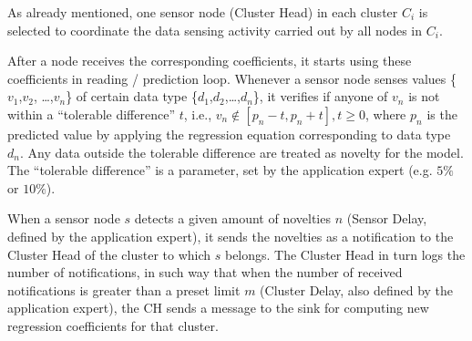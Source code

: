 \documentclass{acm_proc_article-sp}
\begin{document}

As already mentioned, one sensor node (Cluster Head) in each cluster $C_{i}$ is
selected to coordinate the data sensing activity carried out by all nodes in
$C_{i}$.

After a node receives the corresponding coefficients, it starts using these
coefficients in reading / prediction loop.
Whenever a sensor node senses values \{$v_{1}$,$v_{2}$, \ldots,$v_{n}$\} of
certain data type \{$d_{1}$,$d_{2}$,\ldots,$d_{n}$\}, it verifies if anyone of
$v_{n}$ is not within a ``tolerable difference'' $t$, i.e., $v_{n} \not \in
[p_{n}-t,p_{n}+t], t \geq 0$, where $p_{n}$ is the predicted value by applying
the regression equation corresponding to data type $d_{n}$. Any data outside the
tolerable difference are treated as novelty for the model.
The ``tolerable difference'' is a parameter, set by the application expert (e.g.
$5\%$ or $10\%$).



When a sensor node $s$ detects a given amount of novelties $n$ (Sensor Delay,
defined by the application expert), it sends the novelties as a notification to
the Cluster Head of the cluster to which $s$ belongs. The Cluster Head in turn
logs the number of notifications, in such way that when the number of received
notifications is greater than a preset limit $m$ (Cluster Delay, also
defined by the application expert), the CH sends a message to the sink for
computing new regression coefficients for that cluster.
\end{document}

